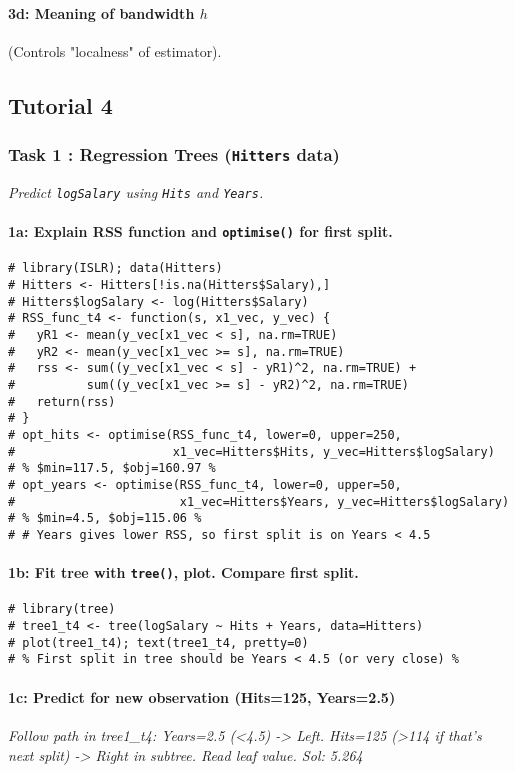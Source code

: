 \documentclass[12pt,a4paper]{article}
\newcommand{\Rfunction}[1]{\texttt{#1()}} %
\newcommand{\Robject}[1]{\texttt{#1}} %
\newcommand{\Rcode}[1]{\texttt{#1}} %
\begin{document}
            \paragraph{3d: Meaning of bandwidth $h$} (Controls "localness" of estimator).

    \subsection{Tutorial 4}
        \subsubsection{Task 1 : Regression Trees (\Robject{Hitters} data)}
            \textit{Predict \Rcode{logSalary} using \Rcode{Hits} and \Rcode{Years}.}
            \paragraph{1a: Explain RSS function and \Rfunction{optimise} for first split.}
\begin{lstlisting}
# library(ISLR); data(Hitters)
# Hitters <- Hitters[!is.na(Hitters$Salary),]
# Hitters$logSalary <- log(Hitters$Salary)
# RSS_func_t4 <- function(s, x1_vec, y_vec) {
#   yR1 <- mean(y_vec[x1_vec < s], na.rm=TRUE)
#   yR2 <- mean(y_vec[x1_vec >= s], na.rm=TRUE)
#   rss <- sum((y_vec[x1_vec < s] - yR1)^2, na.rm=TRUE) + 
#          sum((y_vec[x1_vec >= s] - yR2)^2, na.rm=TRUE)
#   return(rss)
# }
# opt_hits <- optimise(RSS_func_t4, lower=0, upper=250, 
#                      x1_vec=Hitters$Hits, y_vec=Hitters$logSalary) 
# % $min=117.5, $obj=160.97 %
# opt_years <- optimise(RSS_func_t4, lower=0, upper=50, 
#                       x1_vec=Hitters$Years, y_vec=Hitters$logSalary) 
# % $min=4.5, $obj=115.06 %
# # Years gives lower RSS, so first split is on Years < 4.5
\end{lstlisting}
            \paragraph{1b: Fit tree with \Rfunction{tree}, plot. Compare first split.}
\begin{lstlisting}
# library(tree)
# tree1_t4 <- tree(logSalary ~ Hits + Years, data=Hitters)
# plot(tree1_t4); text(tree1_t4, pretty=0)
# % First split in tree should be Years < 4.5 (or very close) %
\end{lstlisting}
            \paragraph{1c: Predict for new observation (Hits=125, Years=2.5)}
            \textit{Follow path in tree1\_t4: Years=2.5 (<4.5) -> Left. Hits=125 (>114 if that's next split) -> Right in subtree. Read leaf value. Sol: 5.264}
\end{document}
